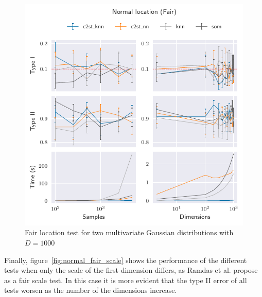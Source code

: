 \begin{figure}[htbp]
    \centering
    \includegraphics{images/6_som/normal_location_fair}
    \caption{Fair location test for two multivariate Gaussian distributions with $D=1000$}
    \label{fig:normal_fair_location}
\end{figure}

Finally, figure~\ref{fig:normal_fair_scale} shows the performance of the different
tests when only the scale of the first dimension differs, as Ramdas et al. propose
as a fair scale test. In this case it is more evident that the type II error of all
tests worsen as the number of the dimensions increase.

